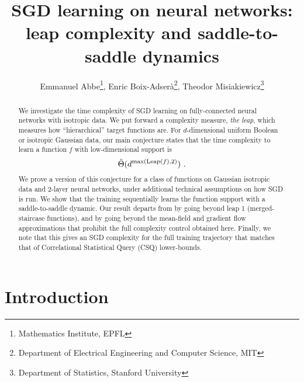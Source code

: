 \documentclass[11pt]{article}
\title{
SGD learning on neural networks: \\
leap complexity and saddle-to-saddle dynamics
}
\author{Emmanuel Abbe\thanks{Mathematics Institute, EPFL}, \;\; Enric Boix-Adser\`a\thanks{Department of Electrical Engineering and Computer Science, MIT}, \;\; Theodor Misiakiewicz\thanks{Department of
    Statistics, Stanford University} }
\newcommand{\<}{\langle}
\renewcommand{\>}{\rangle}
\theoremstyle{definition}
\begin{document}
\maketitle

\begin{abstract}%
   We investigate the time complexity of SGD learning on fully-connected neural networks with isotropic data. We put forward a complexity measure,
{\it the leap}, which measures how “hierarchical” target functions are. 
For $d$-dimensional uniform Boolean or isotropic Gaussian data, our main conjecture states that the time complexity to learn a function $f$ with low-dimensional support is $$\Tilde \Theta (d^{\max(\mathrm{Leap}(f),2)}) \,\,.$$   
We prove a version of this conjecture for a class of functions on Gaussian isotropic data and 2-layer neural networks, under additional technical assumptions on how SGD is run. We show that the training  sequentially learns the function support with a saddle-to-saddle dynamic. Our result departs from \cite{abbe2022merged} by going beyond leap 1 (merged-staircase functions), and by going beyond the mean-field and gradient flow approximations that prohibit the full complexity control obtained here.
Finally, we note that this gives an SGD complexity for the full training trajectory that matches that of Correlational Statistical Query (CSQ) lower-bounds. 
\end{abstract}


\tableofcontents



\section{Introduction}\label{intro}
\end{document}
